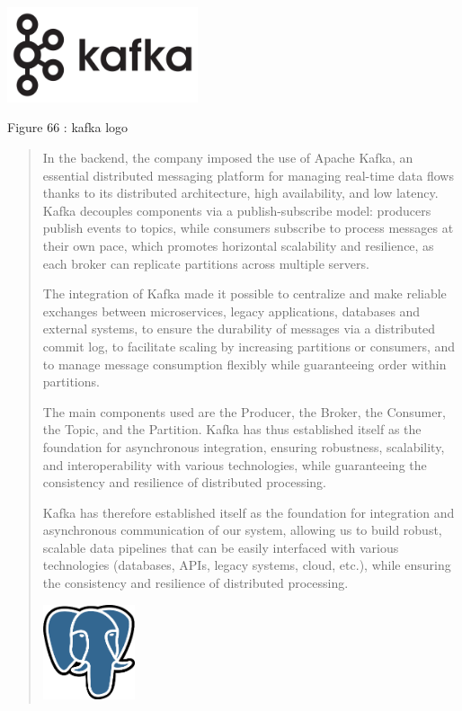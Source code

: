 \documentclass[12pt,a4paper]{report}
\begin{document}
\includegraphics[width=2.2099in,height=1.10236in]{vertopal_d1b0b2209edd4c6aa8254f57daa0953b/media/image85.png}

\protect\hypertarget{_Toc201954542}{}{}Figure 66 : kafka logo

\begin{quote}
In the backend, the company imposed the use of Apache Kafka, an
essential distributed messaging platform for managing real-time data
flows thanks to its distributed architecture, high availability, and low
latency. Kafka decouples components via a publish-subscribe model:
producers publish events to topics, while consumers subscribe to process
messages at their own pace, which promotes horizontal scalability and
resilience, as each broker can replicate partitions across multiple
servers.

The integration of Kafka made it possible to centralize and make
reliable exchanges between microservices, legacy applications, databases
and external systems, to ensure the durability of messages via a
distributed commit log, to facilitate scaling by increasing partitions
or consumers, and to manage message consumption flexibly while
guaranteeing order within partitions.

The main components used are the Producer, the Broker, the Consumer, the
Topic, and the Partition. Kafka has thus established itself as the
foundation for asynchronous integration, ensuring robustness,
scalability, and interoperability with various technologies, while
guaranteeing the consistency and resilience of distributed processing.

Kafka has therefore established itself as the foundation for integration
and asynchronous communication of our system, allowing us to build
robust, scalable data pipelines that can be easily interfaced with
various technologies (databases, APIs, legacy systems, cloud, etc.),
while ensuring the consistency and resilience of distributed processing.

\includegraphics[width=1.06925in,height=1.10236in]{vertopal_d1b0b2209edd4c6aa8254f57daa0953b/media/image86.png}
\end{quote}
\end{document}
